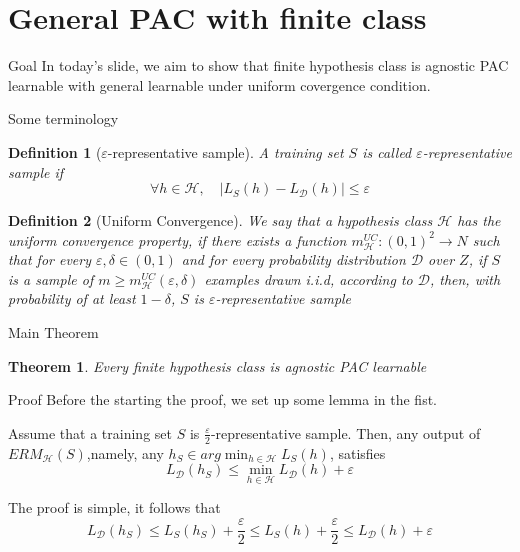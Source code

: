 \documentclass{beamer}
\newtheorem*{dfn}{Definition}
\newtheorem{thm}{Theorem}[subsection]
\begin{document}
\section{General PAC with finite class}
\begin{frame}{Goal}
	In today's slide, we aim to show that finite hypothesis class is agnostic PAC learnable with general learnable under uniform covergence condition. 
\end{frame}
\begin{frame}{Some terminology}
	\begin{dfn}[$\varepsilon$-representative sample]
	A training set $S$ is called $\varepsilon$-representative sample if 
	\[\forall h \in \mathcal{H}, \quad |L_S(h) - L_{\mathcal{D}}(h)| \leq \varepsilon\]
	\end{dfn}
	\begin{dfn}[Uniform Convergence]
		We say that a hypothesis  class $\mathcal{H}$ has the uniform convergence property, if there exists a function $m_{\mathcal{H}}^{UC}:(0,1)^2 \rightarrow N$ such that for every $\varepsilon,\delta \in (0,1)$ and for every probability distribution $\mathcal{D}$ over $Z$, if $S$ is a sample of $m \geq m_{\mathcal{H}}^{UC}(\varepsilon,\delta)$ examples drawn i.i.d, according to $\mathcal{D}$, then, with probability of at least $1-\delta$, $S$ is $\varepsilon$-representative sample
	\end{dfn}

\end{frame}
\begin{frame}{Main Theorem}
	\begin{thm}
Every finite hypothesis class is agnostic PAC learnable
\end{thm}
\end{frame}
\begin{frame}{Proof}
	Before the starting the proof, we set up some lemma in the fist.
	\begin{lemma}
		Assume that a training set $S$ is $\frac{\varepsilon}{2}$-representative sample. Then, any output of $ERM_{\mathcal{H}}(S)$,namely, any $h_S \in arg\min_{h \in \mathcal{H}} L_S(h)$, satisfies
		\[L_{\mathcal{D}}(h_S) \leq \min_{h \in \mathcal{H}} L_{\mathcal{D}} (h) + \varepsilon\]
	\end{lemma}
	The proof is simple, it follows that 
	\[L_{\mathcal{D}} (h_S) \leq L_S(h_S)  + \frac{\varepsilon}{2} \leq L_S(h) + \frac{\varepsilon}{2} \leq L_{\mathcal{D}} (h) + \varepsilon\]
\end{frame}
\end{document}
